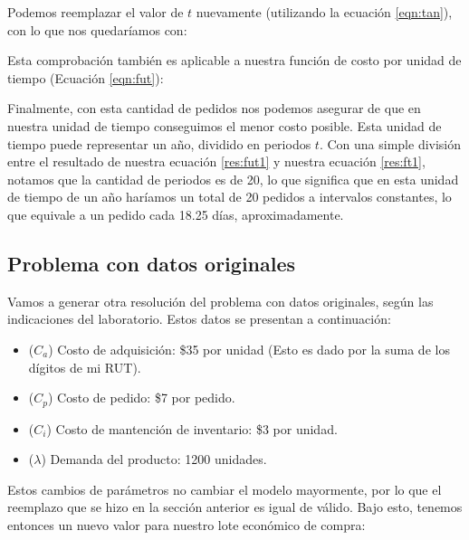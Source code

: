 
Podemos reemplazar el valor de $t$ nuevamente (utilizando la ecuación \ref{eqn:tan}), con lo que nos quedaríamos con:


Esta comprobación también es aplicable a nuestra función de costo por unidad de tiempo (Ecuación \ref{eqn:fut}):


Finalmente, con esta cantidad de pedidos nos podemos asegurar de que en nuestra unidad de tiempo conseguimos el menor costo posible. Esta unidad de tiempo puede representar un año, dividido en periodos $t$. Con una simple división entre el resultado de nuestra ecuación \ref{res:fut1} y nuestra ecuación \ref{res:ft1}, notamos que la cantidad de periodos es de 20, lo que significa que en esta unidad de tiempo de un año haríamos un total de 20 pedidos a intervalos constantes, lo que equivale a un pedido cada 18.25 días, aproximadamente.

\subsection{Problema con datos originales}
Vamos a generar otra resolución del problema con datos originales, según las indicaciones del laboratorio. Estos datos se presentan a continuación:

\begin{itemize}
    \item ($C_a$) Costo de adquisición: \$35 por unidad (Esto es dado por la suma de los dígitos de mi RUT).
    \item ($C_p$) Costo de pedido: \$7 por pedido.
    \item ($C_i$) Costo de mantención de inventario: \$3 por unidad.
    \item ($\lambda$) Demanda del producto: 1200 unidades.
\end{itemize}

Estos cambios de parámetros no cambiar el modelo mayormente, por lo que el reemplazo que se hizo en la sección anterior es igual de válido. Bajo esto, tenemos entonces un nuevo valor para nuestro lote económico de compra:

